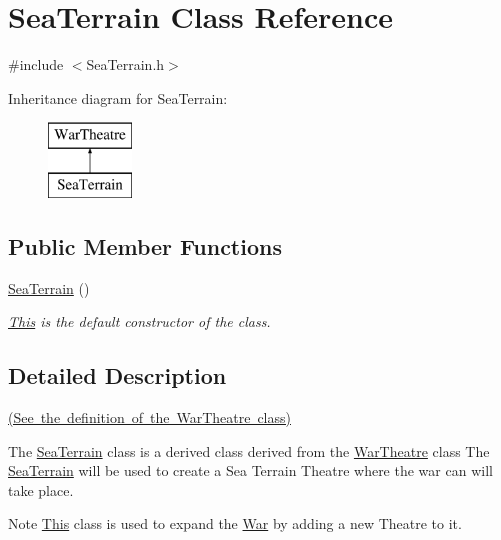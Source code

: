 \hypertarget{class_sea_terrain}{}\section{Sea\+Terrain Class Reference}
\label{class_sea_terrain}


{\ttfamily \#include $<$Sea\+Terrain.\+h$>$}

Inheritance diagram for Sea\+Terrain\+:\begin{figure}[H]
\begin{center}
\leavevmode
\includegraphics[height=2.000000cm]{class_sea_terrain}
\end{center}
\end{figure}
\subsection*{Public Member Functions}
\begin{DoxyCompactItemize}
\item 
\mbox{\hyperlink{class_sea_terrain_a97f6efb8332d4cbc4f9a403eae6d6ac8}{Sea\+Terrain}} ()
\begin{DoxyCompactList}\small\item\em \mbox{\hyperlink{class_this}{This}} is the default constructor of the class. \end{DoxyCompactList}\end{DoxyCompactItemize}


\subsection{Detailed Description}
\mbox{\hyperlink{_war_theatre_8h_source}{(See the definition of the War\+Theatre class)}}

The \mbox{\hyperlink{class_sea_terrain}{Sea\+Terrain}} class is a derived class derived from the \mbox{\hyperlink{class_war_theatre}{War\+Theatre}} class The \mbox{\hyperlink{class_sea_terrain}{Sea\+Terrain}} will be used to create a Sea Terrain Theatre where the war can will take place. \begin{DoxyNote}{Note}
\mbox{\hyperlink{class_this}{This}} class is used to expand the \mbox{\hyperlink{class_war}{War}} by adding a new Theatre to it. 
\end{DoxyNote}


